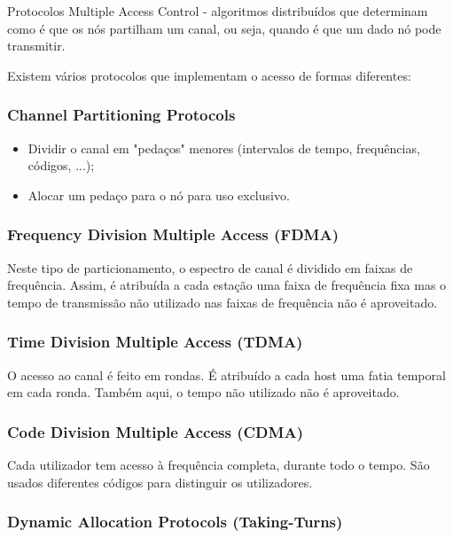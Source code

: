 \documentclass[12pt]{article}
\begin{document}
Protocolos Multiple Access Control - algoritmos distribuídos que determinam como é que os nós partilham um canal, ou seja, quando é que um dado nó pode transmitir.

Existem vários protocolos que implementam o acesso de formas diferentes:

\subsubsection{Channel Partitioning Protocols}

\begin{itemize}
    \item Dividir o canal em "pedaços" menores (intervalos de tempo, frequências, códigos, ...);
    \item Alocar um pedaço para o nó para uso exclusivo.
\end{itemize}

\subsubsection*{Frequency Division Multiple Access (FDMA)}

Neste tipo de particionamento, o espectro de canal é dividido em faixas de frequência. Assim, é atribuída a cada estação uma faixa de frequência fixa mas o tempo de transmissão não utilizado nas faixas de frequência não é aproveitado.

\subsubsection*{Time Division Multiple Access (TDMA)}

O acesso ao canal é feito em rondas. É atribuído a cada host uma fatia temporal em cada ronda. Também aqui, o tempo não utilizado não é aproveitado.

\subsubsection*{Code Division Multiple Access (CDMA)}

Cada utilizador tem acesso à frequência completa, durante todo o tempo.
São usados diferentes códigos para distinguir os utilizadores.

\subsubsection{Dynamic Allocation Protocols (Taking-Turns)}
\end{document}

